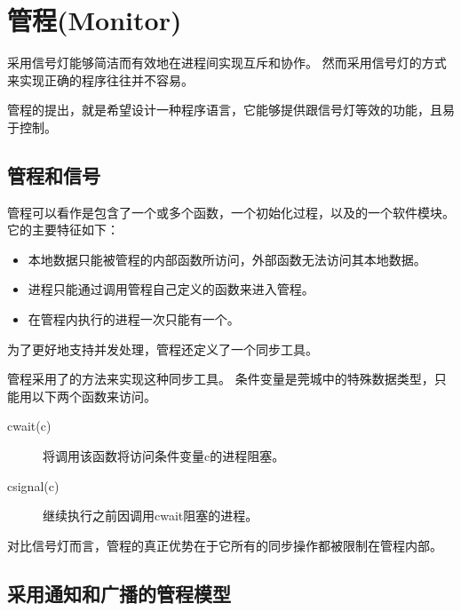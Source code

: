 
\section{管程(Monitor)}
{
    采用信号灯能够简洁而有效地在进程间实现互斥和协作。
    然而采用信号灯的方式来实现正确的程序往往并不容易。

    管程的提出，就是希望设计一种程序语言，它能够提供跟信号灯等效的功能，且易于控制。

    \subsection{管程和信号}
    {
        管程可以看作是包含了一个或多个函数，一个初始化过程，以及的一个软件模块。
        它的主要特征如下：

        \begin{itemize}
            \item 本地数据只能被管程的内部函数所访问，外部函数无法访问其本地数据。
            \item 进程只能通过调用管程自己定义的函数来进入管程。
            \item 在管程内执行的进程一次只能有一个。
        \end{itemize}

        为了更好地支持并发处理，管程还定义了一个同步工具。

        管程采用了的方法来实现这种同步工具。
        条件变量是莞城中的特殊数据类型，只能用以下两个函数来访问。

        \begin{description}
            \item[cwait(c)] 将调用该函数将访问条件变量c的进程阻塞。
            \item[csignal(c)] 继续执行之前因调用cwait阻塞的进程。
        \end{description}

        对比信号灯而言，管程的真正优势在于它所有的同步操作都被限制在管程内部。
    }

    \subsection{采用通知和广播的管程模型}
    {

    }
}
